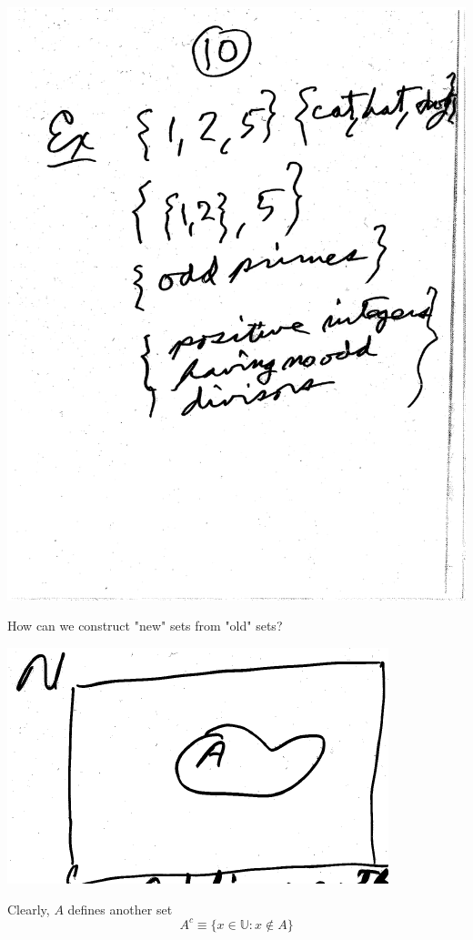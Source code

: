 \documentclass[10pt,a4paper]{article}
\begin{document}
{{\includegraphics[scale=.5]{Pages/ST_10}

\newpage

\noindent How can we construct "new" sets from "old" sets?

\includegraphics[scale=.5]{Pages/ST_11_im1}

\noindent Clearly, $A$ defines another set $$ A^c \equiv \{ x \in \mathbb{U}: x \notin A\} $$

}}
\end{document}
